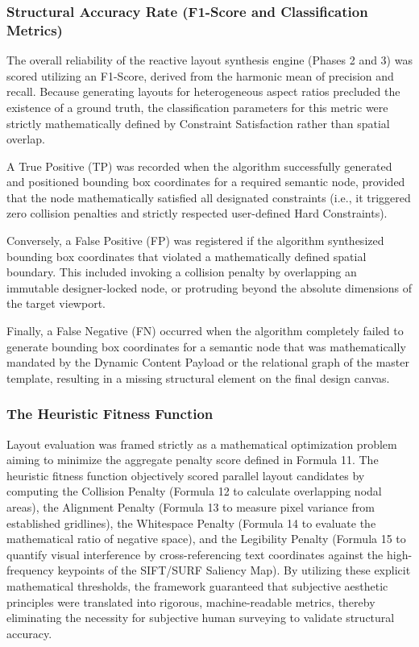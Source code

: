 \begin{refsection}
\subsubsection{Structural Accuracy Rate (F1-Score and Classification Metrics)}
The overall reliability of the reactive layout synthesis engine (Phases 2 and 3) was scored utilizing an F1-Score, derived from the harmonic mean of precision and recall. Because generating layouts for heterogeneous aspect ratios precluded the existence of a ground truth, the classification parameters for this metric were strictly mathematically defined by Constraint Satisfaction rather than spatial overlap.

A True Positive (TP) was recorded when the algorithm successfully generated and positioned bounding box coordinates for a required semantic node, provided that the node mathematically satisfied all designated constraints (i.e., it triggered zero collision penalties and strictly respected user-defined Hard Constraints).

Conversely, a False Positive (FP) was registered if the algorithm synthesized bounding box coordinates that violated a mathematically defined spatial boundary. This included invoking a collision penalty by overlapping an immutable designer-locked node, or protruding beyond the absolute dimensions of the target viewport.

Finally, a False Negative (FN) occurred when the algorithm completely failed to generate bounding box coordinates for a semantic node that was mathematically mandated by the Dynamic Content Payload or the relational graph of the master template, resulting in a missing structural element on the final design canvas.

\subsubsection{The Heuristic Fitness Function}
Layout evaluation was framed strictly as a mathematical optimization problem aiming to minimize the aggregate penalty score defined in Formula 11. The heuristic fitness function objectively scored parallel layout candidates by computing the Collision Penalty (Formula 12 to calculate overlapping nodal areas), the Alignment Penalty (Formula 13 to measure pixel variance from established gridlines), the Whitespace Penalty (Formula 14 to evaluate the mathematical ratio of negative space), and the Legibility Penalty (Formula 15 to quantify visual interference by cross-referencing text coordinates against the high-frequency keypoints of the SIFT/SURF Saliency Map). By utilizing these explicit mathematical thresholds, the framework guaranteed that subjective aesthetic principles were translated into rigorous, machine-readable metrics, thereby eliminating the necessity for subjective human surveying to validate structural accuracy.


\end{refsection}
